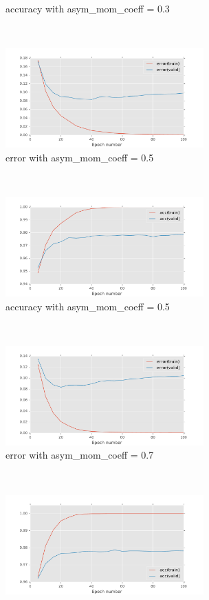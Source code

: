\documentclass[11pt]{article}
\begin{document}
\begin{figure}[t!]
\begin{subfigure}[t]{0.45\textwidth}
        \caption{accuracy with asym\_mom\_coeff = 0.3}
    \end{subfigure}
    ~ 
    \begin{subfigure}[t]{0.45\textwidth}
        \centering
        \includegraphics[height=1.5in]{error_with_asy_mom_0_5.pdf}
        \caption{error with asym\_mom\_coeff = 0.5}
    \end{subfigure}   
    ~
    \begin{subfigure}[t]{0.45\textwidth}
        \centering
        \includegraphics[height=1.5in]{acc_with_asy_mom_0_5.pdf}
        \caption{accuracy with asym\_mom\_coeff = 0.5}
    \end{subfigure}
    ~ 
    \begin{subfigure}[t]{0.45\textwidth}
        \centering
        \includegraphics[height=1.5in]{error_with_asy_mom_0_7.pdf}
        \caption{error with asym\_mom\_coeff = 0.7}
    \end{subfigure}   
    ~
    \begin{subfigure}[t]{0.45\textwidth}
        \centering
        \includegraphics[height=1.5in]{acc_with_asy_mom_0_7.pdf}

\end{subfigure}
\end{figure}
\end{document}
